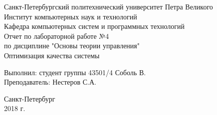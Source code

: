 	\begin{titlepage}
		\begin{center}
			Санкт-Петербургский политехнический университет Петра Великого\\
			Институт компьютерных наук и технологий\\
			Кафедра компьютерных систем и программных технологий\\
			\vspace{6cm}
			Отчет по лабораторной работе №4\\
			\vspace{0.2cm}	
			по дисциплине "Основы теории управления"\\
			\vspace{0.5cm}	
			\Large
			Оптимизация качества системы
			\small
		\end{center}
		\vspace{5cm}
		\begin{flushright}
			Выполнил: студент группы 43501/4	Соболь В.\\
			\vspace{0.5cm}			
			Преподаватель: Нестеров С.А.\\
		\end{flushright}
		\vspace{7cm}
		\begin{center}
			Санкт-Петербург\\
			2018 г.\\
		\end{center}
	\end{titlepage}
	\newpage